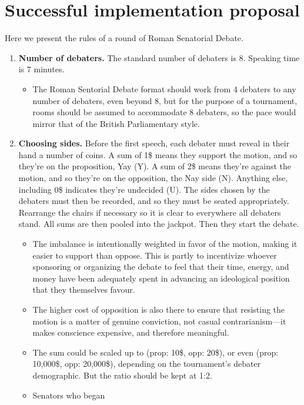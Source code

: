 \section{Successful implementation proposal}

Here we present the rules of a round of Roman Senatorial Debate.

\begin{enumerate}
    \item  \textbf{Number of debaters.} The standard number of debaters is 8. Speaking time is 7 minutes.
    \begin{itemize}
        \item The Roman Sentorial Debate format should work from 4 debaters to any number of debaters, even beyond 8, but for the purpose of a tournament, rooms should be assumed to accommodate 8 debaters, so the pace would mirror that of the British Parliamentary style.  
    \end{itemize}
    \item \textbf{Choosing sides.} Before the first speech, each debater must reveal in their hand a number of coins. A sum of 1\$ means they support the motion, and so they're on the proposition, Yay (Y). A sum of 2\$ means they're against the motion, and so they're on the opposition, the Nay side (N). Anything else, including 0\$ indicates they're undecided (U). The sides chosen by the debaters must then be recorded, and so they must be seated appropriately. Rearrange the chairs if necessary so it is clear to everywhere all debaters stand. All sums are then pooled into the jackpot. Then they start the debate.
    \begin{itemize}
        \item The imbalance is intentionally weighted in favor of the motion, making it easier to support than oppose. This is partly to incentivize whoever sponsoring or organizing the debate to feel that their time, energy, and money have been adequately spent in advancing an ideological position that they themselves favour.
        \item The higher cost of opposition is also there to ensure that resisting the motion is a matter of genuine conviction, not casual contrarianism—it makes conscience expensive, and therefore meaningful.
        \item The sum could be scaled up to (prop: 10\$, opp: 20\$), or even (prop: 10,000\$, opp: 20,000\$), depending on the tournament's debater demographic. But the ratio should be kept at 1:2. 
        \item Senators who began 
    \end{itemize}


\end{enumerate}

